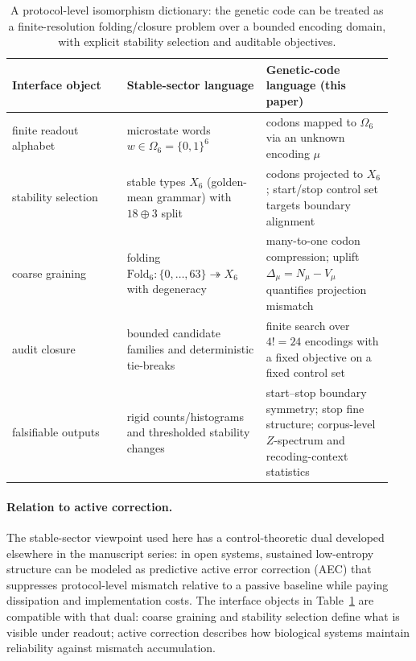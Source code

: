 \begin{table}[t]
\centering
\small
\setlength{\tabcolsep}{4pt}
\renewcommand{\arraystretch}{1.15}
\begin{tabular}{>{\raggedright\arraybackslash}p{0.29\linewidth}>{\raggedright\arraybackslash}p{0.34\linewidth}>{\raggedright\arraybackslash}p{0.31\linewidth}}
\toprule
Interface object & Stable-sector language & Genetic-code language (this paper) \\
\midrule
finite readout alphabet & microstate words $w\in\Omega_6=\{0,1\}^6$ & codons mapped to $\Omega_6$ via an unknown encoding $\mu$ \\
stability selection & stable types $X_6$ (golden-mean grammar) with $18\oplus 3$ split & codons projected to $X_6$; start/stop control set targets boundary alignment \\
coarse graining & folding $\mathrm{Fold}_6:\{0,\dots,63\}\twoheadrightarrow X_6$ with degeneracy & many-to-one codon compression; uplift $\Delta_\mu=N_\mu-V_\mu$ quantifies projection mismatch \\
audit closure & bounded candidate families and deterministic tie-breaks & finite search over $4!=24$ encodings with a fixed objective on a fixed control set \\
falsifiable outputs & rigid counts/histograms and thresholded stability changes & start--stop boundary symmetry; stop fine structure; corpus-level $Z$-spectrum and recoding-context statistics \\
\bottomrule
\end{tabular}
\caption{A protocol-level isomorphism dictionary: the genetic code can be treated as a finite-resolution folding/closure problem over a bounded encoding domain, with explicit stability selection and auditable objectives.}
\label{tab:isomorphism_dictionary}
\end{table}

\paragraph{Relation to active correction.}
The stable-sector viewpoint used here has a control-theoretic dual developed elsewhere in the manuscript series: in open systems, sustained low-entropy structure can be modeled as predictive active error correction (AEC) that suppresses protocol-level mismatch relative to a passive baseline while paying dissipation and implementation costs.
The interface objects in Table~\ref{tab:isomorphism_dictionary} are compatible with that dual: coarse graining and stability selection define what is visible under readout; active correction describes how biological systems maintain reliability against mismatch accumulation.
\cite{Ma2025BioTeleology,Ma2025Z128SM}

